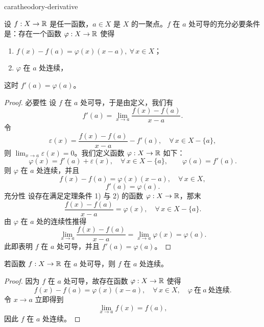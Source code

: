 \begin{mythm}{}{caratheodory-derivative}

	设 \(f:X\to\mathbb{R}\) 是任一函数，\(a\in X\) 是 \(X\) 的一聚点。\(f\) 在 \(a\) 处可导的充分必要条件是：存在一个函数 \(\varphi:X\to\mathbb{R}\) 使得

	\begin{enumerate}[label=\arabic*)]
		\item \(f(x)-f(a)=\varphi(x)(x-a),\ \forall\,x\in X\)；

		\item \(\varphi\) 在 \(a\) 处连续，
	\end{enumerate}

	这时 \(f'(a)=\varphi(a)\)。

\end{mythm}

\begin{proof}

	必要性 设 \(f\) 在 \(a\) 处可导，于是由定义，我们有
	\[
	f'(a)=\lim_{x\to a}\frac{f(x)-f(a)}{x-a}.
	\]
	令
	\[
	\varepsilon(x)=\frac{f(x)-f(a)}{x-a}-f'(a),\quad\forall\,x\in X-\{a\},
	\]
	则 \(\lim_{x\to a}\varepsilon(x)=0\)。我们定义函数 \(\varphi:X\to\mathbb{R}\) 如下：
	\[
	\varphi(x)=f'(a)+\varepsilon(x),\quad\forall\,x\in X-\{a\},\qquad\varphi(a)=f'(a).
	\]
	则 \(\varphi\) 在 \(a\) 处连续，并且
	\[
	f(x)-f(a)=\varphi(x)(x-a),\quad\forall\,x\in X,
	\]
	\[
	f'(a)=\varphi(a).
	\]
	充分性 设存在满足定理条件 1) 与 2) 的函数 \(\varphi:X\to\mathbb{R}\)，那末
	\[
	\frac{f(x)-f(a)}{x-a}=\varphi(x),\quad\forall\,x\in X-\{a\}.
	\]
	由 \(\varphi\) 在 \(a\) 处的连续性推得
	\[
	\lim_{x\to a}\frac{f(x)-f(a)}{x-a}=\lim_{x\to a}\varphi(x)=\varphi(a).
	\]
	此即表明 \(f\) 在 \(a\) 处可导，并且 \(f'(a)=\varphi(a)\)。

\end{proof}

\begin{mycor*}{}

	若函数 \(f:X\to\mathbb{R}\) 在 \(a\) 处可导，则 \(f\) 在 \(a\) 处连续。

\end{mycor*}

\begin{proof}

	因为 \(f\) 在 \(a\) 处可导，故存在函数 \(\varphi:X\to\mathbb{R}\) 使得
	\[
	f(x)-f(a)=\varphi(x)(x-a),\quad\forall\,x\in X,\quad\varphi\ \text{在}\ a\ \text{处连续}.
	\]
	令 \(x\to a\) 立即得到
	\[
	\lim_{x\to a}f(x)=f(a),
	\]
	因此 \(f\) 在 \(a\) 处连续。

\end{proof}

